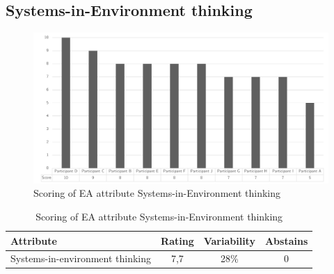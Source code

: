 \subsection{Systems-in-Environment thinking}
\begin{figure}[H]
	\centering
	\includegraphics[width=0.9\linewidth]{images/scoreeasystemsinenvironmentthinking}
	\caption[Scoring of EA attribute Systems-in-Environment thinking]{Scoring of EA attribute Systems-in-Environment thinking}
	\label{fig:appscoringeasystemsinenvironmentthinking}
\end{figure}
\begin{table}[H]
	\centering
	\begin{tabular}{p{}ccc}
		\toprule
		\textbf{Attribute} & \textbf{Rating} & \textbf{Variability} & \textbf{Abstains} \\
		\midrule
		Systems-in-environment thinking & 7,7 & 28\% & 0 \\%
		\bottomrule
	\end{tabular}%
	\caption[Scoring of EA attribute Systems-in-Environment thinking]{Scoring of EA attribute Systems-in-Environment thinking}
	\label{tab:appscoringeasystemsinenvironmentthinking}%
\end{table}%
\newpage
